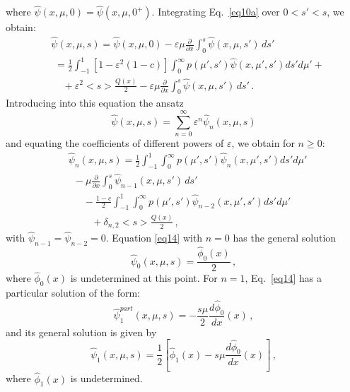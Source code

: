 \documentclass{anstrans}
\newcommand{\bl}{\big<}
\newcommand{\bg}{\big>}
\newcommand{\eps}{\varepsilon}
\begin{document}
where $\hat\psi(x,\mu,0) = \hat\psi(x,\mu,0^+)$. Integrating Eq.\ \eqref{eq10a} over $0 < s' < s$, we obtain:
   \begin{align}
      &\hat\psi( x, \mu, s)  = \hat\psi(x,\mu, 0) - \varepsilon \mu\frac{\partial}{\partial x} \int_0^s \hat\psi(x, \mu, s') \, ds' \\
      & \,\, = \frac{1}{2}\int_{-1}^1 [1-\eps^2(1-c)] \int_0^{\infty} p(\mu',s')
\hat\psi(x, \mu', s') ds' d\mu' + \nonumber\\
         &\,\,\,\,\,\,\, + \varepsilon^2 \bl s\bg \frac{Q(x)}{2} - \varepsilon \mu\frac{\partial}{\partial x} \int_0^s \hat\psi(x, \mu, s') \, ds' \,.\nonumber
   \end{align}
Introducing into this equation the ansatz 
   \begin{equation}
 \hat\psi(x, \mu, s) =  \sum_{n=0}^{\infty} \varepsilon^n
       \hat\psi_n(x, \mu, s) 
       \end{equation}
and equating the coefficients of different powers of $\varepsilon$, we obtain for $n \ge 0$:
   \begin{align}
&      \hat\psi_n(x,\mu, s)  = \frac{1}{2}\int_{-1}^1 \int_0^{\infty} p(\mu',s')
\hat\psi_n(x, \mu', s') ds' d\mu' \label{eq14}\\
&\,\,\, - \mu\frac{\partial}{\partial x} \int_0^s \hat\psi_{n-1}(x, \mu, s') \, ds' \nonumber \\
& \,\,\,\,\,\,\,\,\, -\frac{1-c}{2}\int_{-1}^1 \int_0^{\infty} p(\mu',s')
\hat\psi_{n-2}(x, \mu', s') ds' d\mu' \nonumber\\   
      & \,\,\,\,\,\,\,\,\,\,\,\,\,\,+ \delta_{n,2} \bl s\bg \frac{Q( x)}{2} \,, 
   \nonumber
   \end{align}
with $\hat\psi_{n-1}=\hat\psi_{n-2}=0$. Equation \eqref{eq14} with $n=0$ has the general solution
   \begin{equation}
      \hat\psi_0(x, \mu, s) = \frac{\hat\phi_0(x)}{2} \,,
   \end{equation}
where $\hat\phi_0(x)$ is undetermined at this point. For $n=1$,
Eq.\ \eqref{eq14} has a particular solution of the form:
    \begin{equation}
      \hat\psi^{part}_1(x, \mu, s) = - \frac{s\mu}{2}\frac{d \hat\phi_0}{d x}(x) \,,
   \end{equation}   
and its general solution is given by 
   \begin{equation}
      \hat\psi_1( x, \mu, s) =  \frac{1}{2}\left[\hat\phi_1( x) - s\mu\frac{d \hat\phi_0}{d x}(x)\right] \,,
   \label{eq17}
  \end{equation}  
where $\hat\phi_1(x)$ is undetermined.
\end{document}
